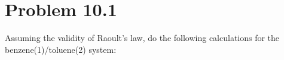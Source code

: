 \documentclass{article}
\begin{document}
\section*{Problem 10.1}
Assuming the validity of Raoult's law, do the following calculations
for the benzene(1)/toluene(2) system:
\end{document}
